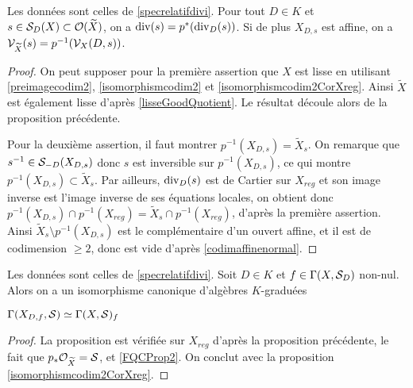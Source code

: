 \begin{prop}\label{pstarprincipal}
Les données sont celles de \ref{specrelatifdivi}. Pour tout $D\in K$ et $s\in\mathcal{S}_D(X)\subset \mathcal{O}(\widetilde{X})$, on a $\operatorname{div}(s)=p^*(\operatorname{div}_D(s))$. Si de plus $X_{D,s}$ est affine, on a $\mathcal{V}_{\widetilde{X}}(s)=p^{-1}(\mathcal{V}_X(D,s))$.
\end{prop}
\begin{proof}
On peut supposer pour la première assertion que $X$ est lisse en utilisant \ref{preimagecodim2}, \ref{isomorphismcodim2} et \ref{isomorphismcodim2CorXreg}. Ainsi $\widetilde{X}$ est également lisse d'après \ref{lisseGoodQuotient}. Le résultat découle alors de la proposition précédente.

Pour la deuxième assertion, il faut montrer $p^{-1}(X_{D,s})=\widetilde{X}_s$. On remarque que $s^{-1}\in \mathcal{S}_{-D}(X_{D,s})$ donc $s$ est inversible sur $p^{-1}(X_{D,s})$, ce qui montre $p^{-1}(X_{D,s})\subset \widetilde{X}_s$. Par ailleurs, $\operatorname{div}_D(s)$ est de Cartier sur $X_{reg}$ et son image inverse est l'image inverse de ses équations locales, on obtient donc $p^{-1}(X_{D,s})\cap p^{-1}(X_{reg})=\widetilde{X}_s \cap p^{-1}(X_{reg})$, d'après la première assertion. Ainsi $\widetilde{X}_s \setminus p^{-1}(X_{D,s})$ est le complémentaire d'un ouvert affine, et il est de codimension $\geq 2$, donc est vide d'après \ref{codimaffinenormal}.
\end{proof}

\begin{prop}\label{CoxIsomorphismLocalisation}
Les données sont celles de \ref{specrelatifdivi}. Soit $D\in K$ et $f\in\Gamma(X,\mathcal{S}_D)$ non-nul. Alors on a un isomorphisme canonique d'algèbres $K$-graduées
\begin{center}
$\Gamma(X_{D,f},\mathcal{S})\simeq \Gamma(X,\mathcal{S})_f$
\end{center}
\end{prop}
\begin{proof}
La proposition est vérifiée sur $X_{reg}$ d'après la proposition précédente, le fait que $p_*\mathcal{O}_{\widetilde{X}}=\mathcal{S}$, et \ref{FQCProp2}. On conclut avec la proposition \ref{isomorphismcodim2CorXreg}.
\end{proof}

